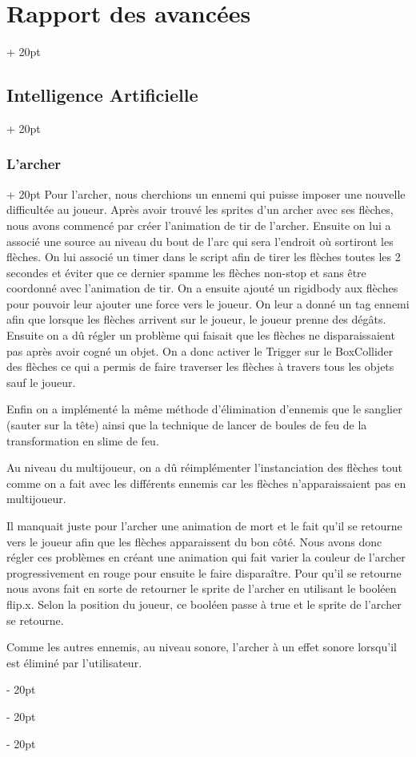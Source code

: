 \documentclass[a4paper, 12pt, twoside]{article}
\newcommand{\ind}[1][20pt]{\advance\leftskip + #1}
\newcommand{\deind}[1][20pt]{\advance\leftskip - #1}
\newenvironment{indt}[2][20pt]{#2 \par \ind[#1]}{\par \deind} %
\begin{document}
\begin{indt}{\section{Rapport des avancées}}
\begin{indt}{\subsection{Intelligence Artificielle}}
\begin{indt}{\subsubsection{L’archer}}
                Pour l’archer, nous cherchions un ennemi qui puisse imposer une nouvelle difficultée au joueur. Après avoir trouvé les sprites d’un archer avec ses flèches, nous avons commencé par créer l’animation de tir de l’archer. Ensuite on lui a associé une source au niveau du bout de l’arc qui sera l’endroit où sortiront les flèches. On lui associé un timer dans le script afin de tirer les flèches toutes les 2 secondes et éviter que ce dernier spamme les flèches non-stop et sans être coordonné avec l’animation de tir. On a ensuite ajouté un rigidbody aux flèches pour pouvoir leur ajouter une force vers le joueur. On leur a donné un tag ennemi afin que lorsque les flèches arrivent sur le joueur, le joueur prenne des dégâts.  Ensuite on a dû régler un problème qui faisait que les flèches ne disparaissaient pas après avoir cogné un objet. On a donc activer le Trigger sur le BoxCollider des flèches ce qui a permis de faire traverser les flèches à travers tous les objets sauf le joueur.

                Enfin on a implémenté la même méthode d’élimination d’ennemis que le sanglier (sauter sur la tête) ainsi que la technique de lancer de boules de feu de la transformation en slime de feu.

                Au niveau du multijoueur, on a dû réimplémenter l'instanciation des flèches tout comme on a fait avec les différents ennemis car les flèches n’apparaissaient pas en multijoueur.

                Il manquait juste pour l’archer une animation de mort et le fait qu’il se retourne vers le joueur afin que les flèches apparaissent du bon côté. Nous avons donc régler ces problèmes en créant une animation qui fait varier la couleur de l’archer progressivement en rouge pour ensuite le faire disparaître. Pour qu’il se retourne nous avons fait en sorte de retourner le sprite de l’archer en utilisant le booléen flip.x. Selon la position du joueur, ce booléen passe à true et le sprite de l’archer se retourne.

                Comme les autres ennemis, au niveau sonore, l’archer à un effet sonore lorsqu'il est éliminé par l’utilisateur.
            \end{indt}


\end{indt}
\end{indt}
\end{document}
